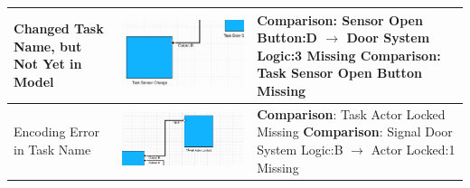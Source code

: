 \begin{longtable}{p{} >{\raggedright\arraybackslash}m{} >{\raggedright\arraybackslash}m{}}
    \midrule
    Changed Task Name, but Not Yet in Model & \includegraphics[width=\linewidth]{pictures/91_modified_task_name_input_clip.png} & \textbf{Comparison}: Sensor Open Button:D $\rightarrow$ Door System Logic:3 Missing \newline \textbf{Comparison}: Task Sensor Open Button Missing \\
    \midrule
    Encoding Error in Task Name & \includegraphics[width=\linewidth]{pictures/90_encoding_error_input_clip.png} & \textbf{Comparison}: Task Actor Locked Missing \newline \textbf{Comparison}: Signal Door System Logic:B $\rightarrow$ Actor Locked:1 Missing \\
\end{longtable}

